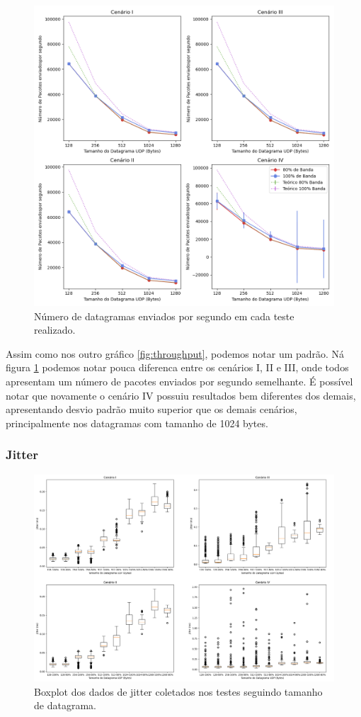 \begin{figure}[t]
    \centering
    \includegraphics[width=0.9\linewidth]{sources/fig-pacotes.png}
    \caption{Número de datagramas enviados por segundo em cada teste realizado.}
    \label{fig:num pacotes}
\end{figure}

Assim como nos outro gráfico \ref{fig:throughput}, podemos notar um padrão. Ná figura \ref{fig:num pacotes} podemos notar pouca diferenca entre os cenários I, II e III, onde todos apresentam um número de pacotes enviados por segundo semelhante. É possível notar que novamente o cenário IV possuiu resultados bem diferentes dos demais, apresentando desvio padrão muito superior que os demais cenários, principalmente nos datagramas com tamanho de 1024 bytes.

\subsubsection{Jitter}

\begin{figure}[H]
    \centering
    \includegraphics[width=0.9\linewidth]{sources/fig-jitter.png}
    \caption{Boxplot dos dados de jitter coletados nos testes seguindo tamanho de datagrama.}
    \label{fig:jitter}
\end{figure}

